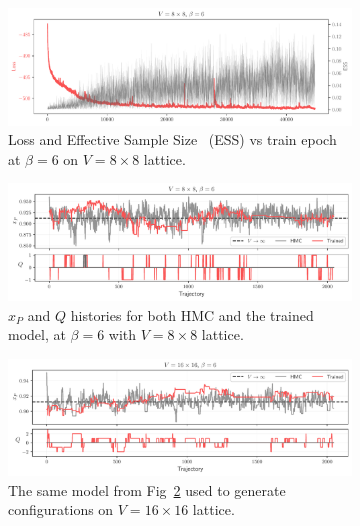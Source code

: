 \documentclass[a4paper,11pt]{article}
\begin{document}
\begin{figure}[htpb]
    \centering
    \begin{subfigure}[b]{\textwidth}
        \includegraphics[width=\textwidth]{assets/ess_loss_dkl_train.pdf}
        \caption{\label{subfig:loss}Loss and Effective Sample
        Size~\cite{2018arXiv180904129E} (ESS) vs train epoch at \(\beta = 6\)
    on \(V = 8\times 8\) lattice.}
    \end{subfigure}
    \begin{subfigure}[b]{\textwidth}
        \includegraphics[width=\textwidth]{assets/histories_8x8_beta6.pdf}
        \caption{\label{subfig:q8}\(x_{P}\) and \(Q\) histories for both HMC
            and the trained model, at \(\beta = 6\) with \(V = 8 \times 8\)
        lattice.}
    \end{subfigure}
    \hfill
    \begin{subfigure}[b]{\textwidth}
        \includegraphics[width=\textwidth]{assets/histories_16x16_beta6_xfr.pdf}
        \caption{\label{subfig:q16}The same model from Fig~\ref{subfig:q8} used
        to generate configurations on \(V = 16\times16\) lattice.}
    \end{subfigure}
    \caption{\label{fig:histories}}
\end{figure}
%
\end{document}
